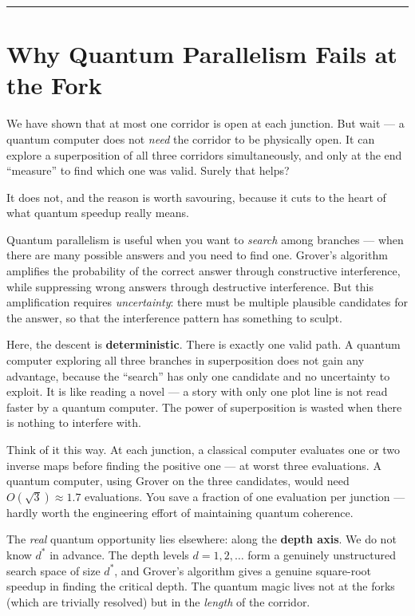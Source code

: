 \bigskip\noindent\rule{\linewidth}{0.4pt}\bigskip

\section{Why Quantum Parallelism Fails at the Fork}
We have shown that at most one corridor is open at each junction. But wait --- a quantum computer does not \emph{need} the corridor to be physically open. It can explore a superposition of all three corridors simultaneously, and only at the end ``measure'' to find which one was valid. Surely that helps?

It does not, and the reason is worth savouring, because it cuts to the heart of what quantum speedup really means.

Quantum parallelism is useful when you want to \emph{search} among branches --- when there are many possible answers and you need to find one. Grover's algorithm amplifies the probability of the correct answer through constructive interference, while suppressing wrong answers through destructive interference. But this amplification requires \emph{uncertainty}: there must be multiple plausible candidates for the answer, so that the interference pattern has something to sculpt.

Here, the descent is \textbf{deterministic}. There is exactly one valid path. A quantum computer exploring all three branches in superposition does not gain any advantage, because the ``search'' has only one candidate and no uncertainty to exploit. It is like reading a novel --- a story with only one plot line is not read faster by a quantum computer. The power of superposition is wasted when there is nothing to interfere with.

Think of it this way. At each junction, a classical computer evaluates one or two inverse maps before finding the positive one --- at worst three evaluations. A quantum computer, using Grover on the three candidates, would need \(O(\sqrt{3}) \approx 1.7\) evaluations. You save a fraction of one evaluation per junction --- hardly worth the engineering effort of maintaining quantum coherence.

The \emph{real} quantum opportunity lies elsewhere: along the \textbf{depth axis}. We do not know \(d^*\) in advance. The depth levels \(d = 1, 2, \ldots\) form a genuinely unstructured search space of size \(d^*\), and Grover's algorithm gives a genuine square-root speedup in finding the critical depth. The quantum magic lives not at the forks (which are trivially resolved) but in the \emph{length} of the corridor.


